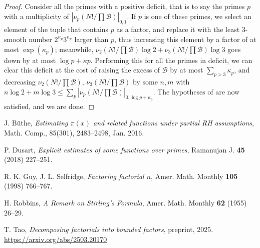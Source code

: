 \documentclass[12pt,a4paper,reqno]{amsart}
\numberwithin{equation}{section}
\theoremstyle{plain}
\theoremstyle{definition}
\newcommand\tuple{{\mathcal B}}
\begin{document}
\begin{proof} Consider all the primes with a positive deficit, that is to say the primes $p$ with a multiplicity of $|\nu_p(N!/\prod \tuple)|_{0,1}$.  If $p$ is one of these primes, we select an element of the tuple that contains $p$ as a factor, and replace it with the least $3$-smooth number $2^{n_p} 3^{n_p}$ larger than $p$, thus increasing this element by a factor of at most $\exp(\kappa_p)$; meanwhile, $\nu_2(N!/\prod \tuple) \log 2 + \nu_3(N!/\prod \tuple) \log 3$ goes down by at most $\log p + \kappa p$.  Performing this for all the primes in deficit, we can clear this deficit at the cost of raising the excess of $\tuple$ by at most $\sum_{p>3} \kappa_p$, and decreasing $\nu_2(N!/\prod \tuple)$, $\nu_3(N!/\prod \tuple)$ by some $n,m$ with $n \log 2 + m \log 3 \leq \sum_p |\nu_p(N!/\prod \tuple)|_{0,\log p+\kappa_p}$.  The hypotheses of  are now satisfied, and we are done.
\end{proof}
\begin{thebibliography}{10}

J. B\"uthe, \emph{Estimating $\pi(x)$ and related functions under partial RH assumptions}, Math. Comp., 85(301), 2483--2498, Jan. 2016.

P. Dusart, \emph{Explicit estimates of some functions over primes}, Ramanujan J. \textbf{45} (2018) 227--251.

R. K. Guy, J. L. Selfridge, \emph{Factoring factorial $n$}, Amer. Math. Monthly \textbf{105} (1998) 766--767.

H. Robbins, \emph{A Remark on Stirling's Formula}, Amer. Math. Monthly \textbf{62} (1955) 26--29.

T. Tao, \emph{Decomposing factorials into bounded factors}, preprint, 2025. \url{https://arxiv.org/abs/2503.20170}

\end{thebibliography}
\end{document}
